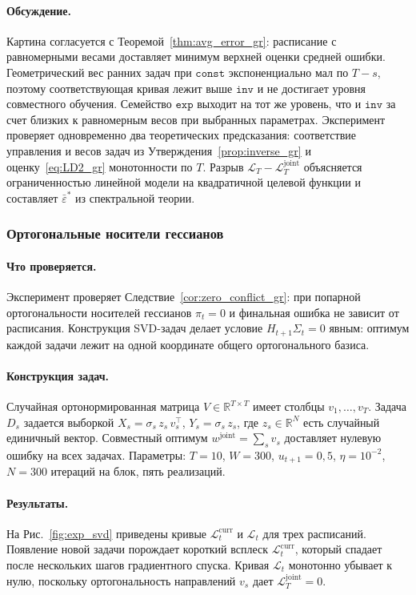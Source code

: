 \documentclass[a4paper,14pt,oneside,openany]{extarticle}
\newcommand{\cL}{\mathcal{L}}
\newcommand{\bbR}{\mathbb{R}}
\begin{document}
\paragraph{Обсуждение.}
Картина согласуется с Теоремой~\ref{thm:avg_error_gr}: расписание с равномерными весами доставляет минимум верхней оценки средней ошибки. Геометрический вес ранних задач при $\texttt{const}$ экспоненциально мал по $T-s$, поэтому соответствующая кривая лежит выше $\texttt{inv}$ и не достигает уровня совместного обучения. Семейство $\texttt{exp}$ выходит на тот же уровень, что и $\texttt{inv}$ за счет близких к равномерным весов при выбранных параметрах. Эксперимент проверяет одновременно два теоретических предсказания: соответствие управления и весов задач из Утверждения~\ref{prop:inverse_gr} и оценку~\eqref{eq:LD2_gr} монотонности по $T$. Разрыв $\cL_T - \cL^{\mathrm{joint}}_T$ объясняется ограниченностью линейной модели на квадратичной целевой функции и составляет $\bar\varepsilon^*$ из спектральной теории.

\subsubsection{Ортогональные носители гессианов}\label{sec:exp_svd}

\paragraph{Что проверяется.}
Эксперимент проверяет Следствие~\ref{cor:zero_conflict_gr}: при попарной ортогональности носителей гессианов $\pi_t = 0$ и финальная ошибка не зависит от расписания. Конструкция SVD-задач делает условие $H_{t+1}\Sigma_t = 0$ явным: оптимум каждой задачи лежит на одной координате общего ортогонального базиса.

\paragraph{Конструкция задач.}
Случайная ортонормированная матрица $V \in \bbR^{T \times T}$ имеет столбцы $v_1, \ldots, v_T$. Задача $D_s$ задается выборкой $X_s = \sigma_s\, z_s\, v_s^\top$, $Y_s = \sigma_s\, z_s$, где $z_s \in \bbR^N$ есть случайный единичный вектор. Совместный оптимум $w^{\mathrm{joint}} = \sum_s v_s$ доставляет нулевую ошибку на всех задачах. Параметры: $T = 10$, $W = 300$, $u_{t+1} = 0{,}5$, $\eta = 10^{-2}$, $N = 300$ итераций на блок, пять реализаций.

\paragraph{Результаты.}
На Рис.~\ref{fig:exp_svd} приведены кривые $\cL^{\mathrm{curr}}_t$ и $\cL_t$ для трех расписаний. Появление новой задачи порождает короткий всплеск $\cL^{\mathrm{curr}}_t$, который спадает после нескольких шагов градиентного спуска. Кривая $\cL_t$ монотонно убывает к нулю, поскольку ортогональность направлений $v_s$ дает $\cL^{\mathrm{joint}}_T = 0$.
\end{document}
